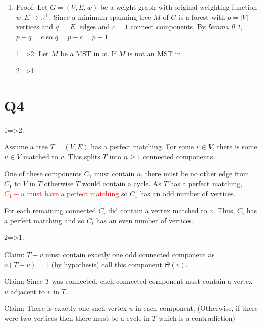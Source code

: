 \documentclass[a4paper, 11pt]{article}
\newcommand{\RR}{\mathbb{R}}
\def\abs#1{\left|#1\right|}
\begin{document}
\begin{multicols*}{2}
\begin{enumerate}[label=(\alph*)]
		\item
		      Proof: Let $G=(V,E,w)$ be a weight graph with original weighting function $w:E\to \RR^+$. Since a minimum spanning tree $M$ of $G$ is a forest with $p=\abs V$ vertices and $q=\abs E$ edges and $c=1$ connect components, By \textit{lemma 0.1}, $p-q=c$ so $q=p-c=p-1$.


		      1=>2:
		      Let $M$ be a MST in $w$. If $M$ is not an MST in


		      2=>1:






	\end{enumerate}

	\section*{Q4}
	1=>2:

	\begin{mdframed}
		Assume a tree $T=(V,E)$ has a perfect matching. For some $v\in V$, there is some $u\in V$ matched to $v$. This splits $T$ into $n\geq 1$ connected components.

		One of these components $C_1$ must contain $u$, there must be no other edge from $C_1$ to $V$ in $T$ otherwise $T$ would contain a cycle. As $T$ has a perfect matching, \textcolor{red}{$C_1-u$ must have a perfect matching} so $C_1$ has an odd number of vertices.

		For each remaining connected $C_i$ did contain a vertex matched to $v$. Thus, $C_i$ has a perfect matching and so $C_i$ has an even number of vertices.
	\end{mdframed}

	2=>1:
	\begin{mdframed}
		Claim: $T-v$ must contain exactly one odd connected component as $o(T-v)=1$ (by hypothesis) call this component $\Theta(v)$.

		Claim: Since $T$ was connected, each connected component must contain a vertex $u$ adjacent to $v$ in $T$.

		Claim: There is exactly one such vertex $u$ in each component. (Otherwise, if there were two vertices then there must be a cycle in $T$ which is a contradiction)


\end{mdframed}
\end{multicols*}
\end{document}
